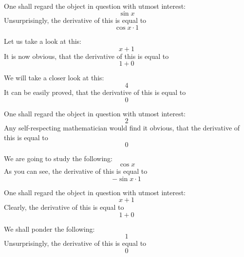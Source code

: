 \documentclass{article}
\begin{document}
One shall regard the object in question with utmost interest:
\begin{equation}
\sin x 
\end{equation}
Unsurprisingly, the derivative of this is equal to
\begin{equation}
\cos x \cdot 1 
\end{equation}

Let us take a look at this:
\begin{equation}
x + 1 
\end{equation}
It is now obvious, that the derivative of this is equal to
\begin{equation}
1 + 0 
\end{equation}

We will take a closer look at this:
\begin{equation}
4 
\end{equation}
It can be easily proved, that the derivative of this is equal to
\begin{equation}
0 
\end{equation}

One shall regard the object in question with utmost interest:
\begin{equation}
2 
\end{equation}
Any self-respecting mathematician would find it obvious, that the derivative of this is equal to
\begin{equation}
0 
\end{equation}

We are going to study the following:
\begin{equation}
\cos x 
\end{equation}
As you can see, the derivative of this is equal to
\begin{equation}
-\sin x \cdot 1 
\end{equation}

One shall regard the object in question with utmost interest:
\begin{equation}
x + 1 
\end{equation}
Clearly, the derivative of this is equal to
\begin{equation}
1 + 0 
\end{equation}

We shall ponder the following:
\begin{equation}
1 
\end{equation}
Unsurprisingly, the derivative of this is equal to
\begin{equation}
0 
\end{equation}
\end{document}
